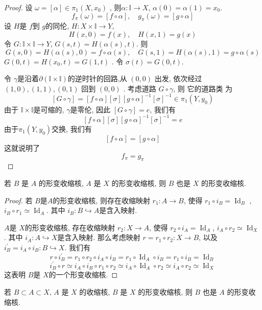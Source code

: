 \documentclass[../main.tex]{subfiles}
\begin{document}
\begin{proof}
    设 \(   \omega = [ \alpha  ]\in  \pi _1 \left( X,x_0 \right)   \) , 则\(  \alpha : \mathbb{I}\to X  \), \(  \alpha \left( 0 \right)= \alpha \left( 1 \right)= x_0    \).   \[
    f_{ \pi }\left(  \omega  \right) = [f\circ \alpha ],\quad g_{ \pi }\left(  \omega  \right)= [g\circ \alpha ] 
    \] 设 \(  H  \)是 \(  f  \)到 \(  g  \)的同伦,    \(  H: X \times \mathbb{I}\to Y  \), \[
    H\left( x,0 \right) = f\left( x \right),\quad H\left( x,1 \right)= g\left( x \right)   
    \]  令 \(  G:\mathbb{I}\times \mathbb{I}\to Y  \), \(  G\left( s,t \right)= H\left( \alpha \left( s \right),t  \right)    \). 则 \[
    G\left( s,0 \right)= H\left( \alpha \left( s \right),0  \right)= f\circ \alpha \left( s \right),\quad G\left( s,1 \right)= H\left( \alpha \left( s \right),1  \right)= g\circ \alpha \left( s \right)      
    \] \(  G\left( 0,t \right)= H\left( x_0,t \right)= G\left( 1,t \right)     \) . 令 \(   \sigma \left( t \right)= G\left( 0,t \right)    \). 
    
    令 \(   \gamma\)是沿着\(   \partial \left( \mathbb{I}\times \mathbb{I} \right)   \)的逆时针的回路,从 $(0,0)$ 出发, 依次经过 $(1,0), (1,1), (0,1)$ 回到 $(0,0)$ . 
 考虑道路 \(  G\circ  \gamma   \), 则 它的道路类 为   \[
    [G\circ  \gamma ]= [f\circ \alpha ] [ \sigma ][g\circ \alpha ]^{-1} [ \sigma ]^{-1} \in   \pi _1 \left( Y,y_0 \right) 
    \] 由于 \(  \mathbb{I}\times \mathbb{I}  \)是可缩的,  \(   \gamma   \)是零伦, 因此 \(  [G\circ  \gamma ]= e  \), 我们有 \[
    [f\circ \alpha ][ \sigma ][g\circ \alpha ]^{-1} [ \sigma ]^{-1} = e
    \]   由于\(   \pi _1 \left( Y,y_0 \right)   \)交换, 我们有 \[
    [f\circ \alpha ]= [g\circ \alpha ]
    \] 这就说明了 \[
    f_{ \pi }= g_{ \pi }
    \]
\end{proof}
\begin{exercise}{}{}
若 $B$ 是 $A$ 的形变收缩核, $A$ 是 $X$ 的形变收缩核, 则 $B$ 也是 $X$ 的形变收缩核.
\end{exercise}
\begin{proof}
    若 \(  B  \)是\(  A  \)的形变收缩核, 则存在收缩映射 \(  r_1:A\to B \), 使得   \(  r_1\circ i_{B}= \operatorname{Id}_{B}  \) , \(i_{B}\circ r_1 \simeq \operatorname{Id}_{A}  \). 其中 \(  i_{B}:B\hookrightarrow A  \)是含入映射.  

    \(  A  \)是 \(  X  \)的形变收缩核, 存在收缩映射 \(  r_2:X\to A  \), 使得 \(  r_2\circ i_{A}= \operatorname{Id}_{A}  \), \(  i_{A}\circ r_2\simeq  \operatorname{Id}_{X}  \).   其中 \(  i_{A}:A\hookrightarrow   X\)是含入映射. 那么考虑映射 \(  r= r_1\circ r_2: X\to B \), 以及 \(  i_{B}^{\prime} = i_{A}\circ i_{B}: B\hookrightarrow X  \). 我们有 \[
    r\circ i_{B}^{\prime} = r_1\circ r_2\circ i_{A}\circ i_{B}= r_1\circ \operatorname{Id}_{A}\circ i_{B}= r_1\circ i_{B}= \operatorname{Id}_{B}
    \]      \[
    i_{B}^{\prime} \circ r\simeq i_{A}\circ i_{B}\circ r_1\circ r_2\simeq i_{A}\circ \operatorname{Id}_{A}\circ r_2\simeq i_{A}\circ r_2\simeq \operatorname{Id}_{X}
    \]这表明 \(  B  \)是 \(  X  \)的一个形变收缩核.  
\end{proof}
\begin{exercise}{}{}
若 $B \subset A \subset X$, $A$ 是 $X$ 的收缩核, $B$ 是 $X$ 的形变收缩核, 则 $B$ 也是 $A$ 的形变收缩核.
\end{exercise}
\end{document}
